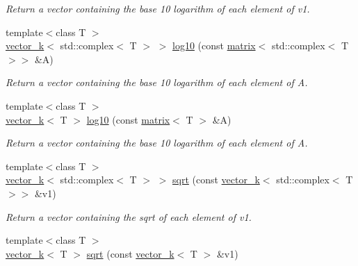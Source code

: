 \begin{DoxyCompactItemize}
\begin{DoxyCompactList}\small\item\em Return a vector containing the base 10 logarithm of each element of v1. \end{DoxyCompactList}\item 
\hypertarget{namespacekeycpp_a06e575bbcbc7b7f0f97f70348699c172}{{\footnotesize template$<$class T $>$ }\\\hyperlink{classkeycpp_1_1vector__k}{vector\-\_\-k}$<$ std\-::complex$<$ T $>$ $>$ \hyperlink{namespacekeycpp_a06e575bbcbc7b7f0f97f70348699c172}{log10} (const \hyperlink{classkeycpp_1_1matrix}{matrix}$<$ std\-::complex$<$ T $>$$>$ \&A)}\label{namespacekeycpp_a06e575bbcbc7b7f0f97f70348699c172}

\begin{DoxyCompactList}\small\item\em Return a vector containing the base 10 logarithm of each element of A. \end{DoxyCompactList}\item 
\hypertarget{namespacekeycpp_a89b9e24c6952c5216ed82d09e5683118}{{\footnotesize template$<$class T $>$ }\\\hyperlink{classkeycpp_1_1vector__k}{vector\-\_\-k}$<$ T $>$ \hyperlink{namespacekeycpp_a89b9e24c6952c5216ed82d09e5683118}{log10} (const \hyperlink{classkeycpp_1_1matrix}{matrix}$<$ T $>$ \&A)}\label{namespacekeycpp_a89b9e24c6952c5216ed82d09e5683118}

\begin{DoxyCompactList}\small\item\em Return a vector containing the base 10 logarithm of each element of A. \end{DoxyCompactList}\item 
\hypertarget{namespacekeycpp_aa4b7e86c9291f2ca9c5aacdb8e08f9ff}{{\footnotesize template$<$class T $>$ }\\\hyperlink{classkeycpp_1_1vector__k}{vector\-\_\-k}$<$ std\-::complex$<$ T $>$ $>$ \hyperlink{namespacekeycpp_aa4b7e86c9291f2ca9c5aacdb8e08f9ff}{sqrt} (const \hyperlink{classkeycpp_1_1vector__k}{vector\-\_\-k}$<$ std\-::complex$<$ T $>$$>$ \&v1)}\label{namespacekeycpp_aa4b7e86c9291f2ca9c5aacdb8e08f9ff}

\begin{DoxyCompactList}\small\item\em Return a vector containing the sqrt of each element of v1. \end{DoxyCompactList}\item 
\hypertarget{namespacekeycpp_a38b52fad75e8cf7db8b8d3ee7d1a7412}{{\footnotesize template$<$class T $>$ }\\\hyperlink{classkeycpp_1_1vector__k}{vector\-\_\-k}$<$ T $>$ \hyperlink{namespacekeycpp_a38b52fad75e8cf7db8b8d3ee7d1a7412}{sqrt} (const \hyperlink{classkeycpp_1_1vector__k}{vector\-\_\-k}$<$ T $>$ \&v1)}\label{namespacekeycpp_a38b52fad75e8cf7db8b8d3ee7d1a7412}


\end{DoxyCompactItemize}
